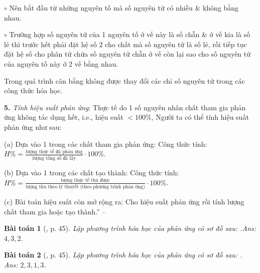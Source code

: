 \documentclass{article}
\numberwithin{equation}{section}
\newtheorem{baitoan}{Bài toán}
\begin{document}
\begin{enumerate*}
\begin{enumerate*}
		\begin{enumerate*}
			\item[$\circ$] Nên bắt đầu từ những nguyên tố mà số nguyên tử có nhiều \& không bằng nhau.
			\item[$\circ$] Trường hợp số nguyên tử của 1 nguyên tố ở vế này là số chẵn \& ở vế kia là số lẻ thì trước hết phải đặt hệ số $2$ cho chất mà số nguyên tử là số lẻ, rồi tiếp tục đặt hệ số cho phân tử chứa số nguyên tử chẵn ở vế còn lại sao cho số nguyên tử của nguyên tố này ở 2 vế bằng nhau.
		\end{enumerate*}
	\end{enumerate*}
	Trong quá trình cân bằng không được thay đổi các chỉ số nguyên tử trong các công thức hóa học.
	\item[\textbf{5.}] \textit{Tính hiệu suất phản ứng}: Thực tế do 1 số nguyên nhân chất tham gia phản ứng không tác dụng hết, i.e., hiệu suất $< 100$\%, Người ta có thể tính hiệu suất phản ứng như sau:
	\begin{enumerate*}
		\item[(a)] Dựa vào 1 trong các chất tham gia phản ứng: Công thức tính: $H\% = \frac{\mbox{lượng thực tế đã phản ứng}}{\mbox{lượng tổng số đã lấy}}\cdot100\%$.
		\item[(b)] Dựa vào 1 trong các chất tạo thành: Công thức tính: $H\% = \frac{\mbox{lượng thực tế thu được}}{\mbox{lượng thu theo lý thuyết (theo phương trình phản ứng)}}\cdot100\%$.
		\item[(c)] Bài toán hiệu suất còn mở rộng ra: Cho hiệu suất phản ứng rồi tính lượng chất tham gia hoặc tạo thành.'' -- \cite[Chap. 2, pp. 44--46]{An_400_BT_Hoa_Hoc_8_2020}
	\end{enumerate*}
\end{enumerate*}

\begin{baitoan}[\cite{An_400_BT_Hoa_Hoc_8_2020}, p. 45]
	Lập phương trình hóa học của phản ứng có sơ đồ sau: \emph{}.\hfill\textsf{Ans:} $4,3,2$.
\end{baitoan}

\begin{baitoan}[\cite{An_400_BT_Hoa_Hoc_8_2020}, p. 45]
	Lập phương trình hóa học của phản ứng có sơ đồ sau: \emph{}.\\\mbox{}\hfill\textsf{Ans:} $2,3,1,3$.
\end{baitoan}
\end{document}
